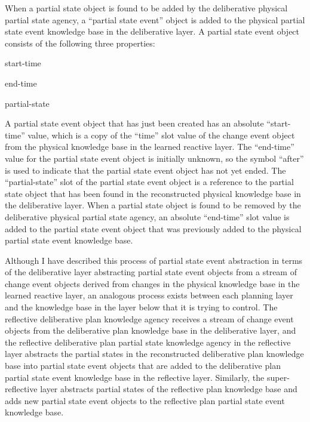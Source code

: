 When a partial state object is found to be added by the deliberative
physical partial state agency, a ``partial state event'' object is
added to the physical partial state event knowledge base in the
deliberative layer.  A partial state event object consists of the
following three properties:
\begin{packed_enumerate}
\item{start-time}
\item{end-time}
\item{partial-state}
\end{packed_enumerate}
A partial state event object that has just been created has an
absolute ``start-time'' value, which is a copy of the ``time'' slot
value of the change event object from the physical knowledge base in
the learned reactive layer.  The ``end-time'' value for the partial
state event object is initially unknown, so the symbol ``after'' is
used to indicate that the partial state event object has not yet
ended.  The ``partial-state'' slot of the partial state event object
is a reference to the partial state object that has been found in the
reconstructed physical knowledge base in the deliberative layer.  When
a partial state object is found to be removed by the deliberative
physical partial state agency, an absolute ``end-time'' slot value is
added to the partial state event object that was previously added to
the physical partial state event knowledge base.

Although I have described this process of partial state event
abstraction in terms of the deliberative layer abstracting partial
state event objects from a stream of change event objects derived from
changes in the physical knowledge base in the learned reactive layer,
an analogous process exists between each planning layer and the
knowledge base in the layer below that it is trying to control.  The
reflective deliberative plan knowledge agency receives a stream of
change event objects from the deliberative plan knowledge base in the
deliberative layer, and the reflective deliberative plan partial state
knowledge agency in the reflective layer abstracts the partial states
in the reconstructed deliberative plan knowledge base into partial
state event objects that are added to the deliberative plan partial
state event knowledge base in the reflective layer.  Similarly, the
super-reflective layer abstracts partial states of the reflective plan
knowledge base and adds new partial state event objects to the
reflective plan partial state event knowledge base.

